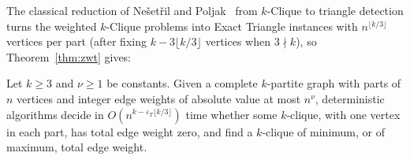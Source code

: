 The classical reduction of Ne\v{s}et\v{r}il and Poljak~\cite{NP85} from $k$-Clique to triangle detection turns the weighted $k$-Clique problems into Exact Triangle instances with $n^{\lfloor k/3\rfloor}$ vertices per part (after fixing $k-3\lfloor k/3\rfloor$ vertices when $3\nmid k$), so Theorem~\ref{thm:zwt} gives:
\begin{corollary}\label{cor:kclique}
Let $k\ge3$ and $\nu\ge1$ be constants. Given a complete $k$-partite graph with parts of $n$ vertices and integer edge weights of absolute value at most $n^\nu$, deterministic algorithms decide in $O(n^{k-\varepsilon_T\lfloor k/3\rfloor})$ time whether some $k$-clique, with one vertex in each part, has total edge weight zero, and find a $k$-clique of minimum, or of maximum, total edge weight.
\end{corollary}
